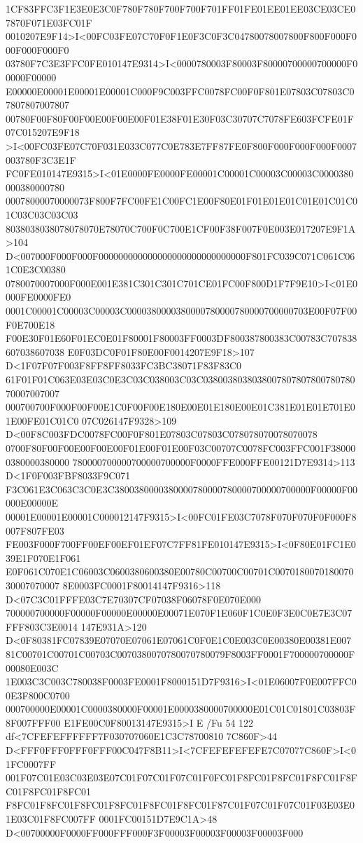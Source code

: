 1CF83FFC3F1E3E0E3C0F780F780F700F700F701FF01FE01EE01EE03CE03CE07870F071E03FC01F
0010207E9F14>I<00FC03FE07C70F0F1E0F3C0F3C04780078007800F800F000F000F000F000F0
03780F7C3E3FFC0FE010147E9314>I<0000780003F80003F80000700000700000F00000F00000
E00000E00001E00001E00001C000F9C003FFC0078FC00F0F801E07803C07803C07807807007807
00780F00F80F00F00E00F00E00F01E38F01E30F03C30707C7078FE603FCFE01F07C015207E9F18
>I<00FC03FE07C70F031E033C077C0E783E7FF87FE0F800F000F000F000F0007003780F3C3E1F
FC0FE010147E9315>I<01E0000FE0000FE00001C00001C00003C00003C0000380000380000780
00078000070000073F800F7FC00FE1C00FC1E00F80E01F01E01E01C01E01C01C01C03C03C03C03
8038038038078078070E78070C700F0C700E1CF00F38F007F0E003E017207E9F1A>104
D<007000F000F000F000000000000000000000000000000F801FC039C071C061C061C0E3C00380
0780070007000F000E001E381C301C301C701CE01FC00F800D1F7F9E10>I<01E0000FE0000FE0
0001C00001C00003C00003C0000380000380000780000780000700000703E00F07F00F0E700E18
F00E30F01E60F01EC0E01F80001F80003FF0003DF800387800383C00783C707838607038607038
E0F03DC0F01F80E00F0014207E9F18>107 D<1F07F07F003F8FF8FF8033FC3BC38071F83F83C0
61F01F01C063E03E03C0E3C03C038003C03C038003803803800780780780078078070007007007
000700700F000F00F00E1C0F00F00E180E00E01E180E00E01C381E01E01E701E01E00FE01C01C0
07C026147F9328>109 D<00F8C003FDC0078FC00F0F801E07803C07803C078078070078070078
0700F80F00F00E00F00E00F01E00F01E00F03C00707C0078FC003FFC001F380000380000380000
780000700000700000700000F0000FFE000FFE00121D7E9314>113 D<1F0F003FBF8033F9C071
F3C061E3C063C3C0E3C3800380000380000780000780000700000700000F00000F00000E00000E
00001E00001E00001C000012147F9315>I<00FC01FE03C7078F070F070F0F000F8007F807FE03
FE003F000F700FF00EF00EF01EF07C7FF81FE010147E9315>I<0F80E01FC1E039E1F070E1F061
E0F061C070E1C06003C0600380600380E00780C00700C00701C007018007018007030007070007
8E0003FC0001F80014147F9316>118 D<07C3C01FFFE03C7E70307CF07038F06078F0E070E000
700000700000F00000F00000E00000E00071E070F1E060F1C0E0F3E0C0E7E3C07FFF803C3E0014
147E931A>120 D<0F80381FC07839E07070E07061E07061C0F0E1C0E003C0E00380E00381E007
81C00701C00701C00703C0070380070780070780079F8003FF0001F700000700000F00080E003C
1E003C3C003C780038F0003FE0001F8000151D7F9316>I<01E06007F0E007FFC00E3F800C0700
000700000E00001C0000380000F00001E0000380000700000E01C01C01801C03803F8F007FFF00
E1FE00C0F80013147E9315>I E /Fu 54 122 df<7CFEFEFFFFFF7F030707060E1C3C78700810
7C860F>44 D<FFF0FFF0FFF0FFF00C047F8B11>I<7CFEFEFEFEFE7C07077C860F>I<01FC0007FF
001F07C01E03C03E03E07C01F07C01F07C01F0FC01F8FC01F8FC01F8FC01F8FC01F8FC01F8FC01
F8FC01F8FC01F8FC01F8FC01F8FC01F8FC01F87C01F07C01F07C01F03E03E01E03C01F8FC007FF
0001FC00151D7E9C1A>48 D<00700000F0000FF000FFF000F3F00003F00003F00003F00003F000
